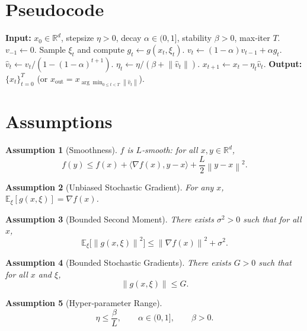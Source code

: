 \documentclass{article}
\newtheorem{assumption}{Assumption}
\newcommand{\E}{\mathbb{E}}
\newcommand{\norm}[1]{\left\lVert#1\right\rVert}
\begin{document}
\section*{Pseudocode}
\begin{algorithm}[H]
\caption{Adaptive Variance‑Reduced Gradient (AVRG)}
\begin{algorithmic}[1]
\STATE \textbf{Input:} $x_0\in\mathbb{R}^d$, stepsize $\eta>0$, decay $\alpha\in(0,1]$, stability $\beta>0$, max‑iter $T$.
\STATE $v_{-1}\leftarrow 0$.
    \STATE Sample $\xi_t$ and compute $g_t\gets g(x_t,\xi_t)$.
    \STATE $v_t\gets (1-\alpha)v_{t-1}+\alpha g_t$.
    \STATE $\hat v_t\gets v_t/(1-(1-\alpha)^{t+1})$.
    \STATE $\eta_t\gets \eta/(\beta+\norm{\hat v_t})$.
    \STATE $x_{t+1}\gets x_t-\eta_t\hat v_t$.
\ENDFOR
\STATE \textbf{Output:} $\{x_t\}_{t=0}^T$ (or $x_{\text{out}}=x_{\arg\min_{0\le t<T}\norm{\hat v_t}}$).
\end{algorithmic}
\end{algorithm}

\section*{Assumptions}
\begin{assumption}[Smoothness]\label{ass:smooth}
$f$ is $L$‑smooth: for all $x,y\in\mathbb{R}^d$,
\[
f(y)\le f(x)+\langle\nabla f(x),y-x\rangle+\frac{L}{2}\norm{y-x}^2 .
\]
\end{assumption}
\begin{assumption}[Unbiased Stochastic Gradient]\label{ass:unbiased}
For any $x$, $\E_{\xi}[g(x,\xi)]=\nabla f(x)$.
\end{assumption}
\begin{assumption}[Bounded Second Moment]\label{ass:bounded}
There exists $\sigma^2>0$ such that for all $x$,
\[
\E_{\xi}\!\big[\norm{g(x,\xi)}^2\big]\le \norm{\nabla f(x)}^2+\sigma^2 .
\]
\end{assumption}
\begin{assumption}[Bounded Stochastic Gradients]\label{ass:boundedgrad}
There exists $G>0$ such that for all $x$ and $\xi$,
\[
\norm{g(x,\xi)}\le G .
\]
\end{assumption}
\begin{assumption}[Hyper‑parameter Range]\label{ass:hyper}
\[
\eta\le\frac{\beta}{L},\qquad \alpha\in(0,1],\qquad \beta>0 .
\]
\end{assumption}
\end{document}
